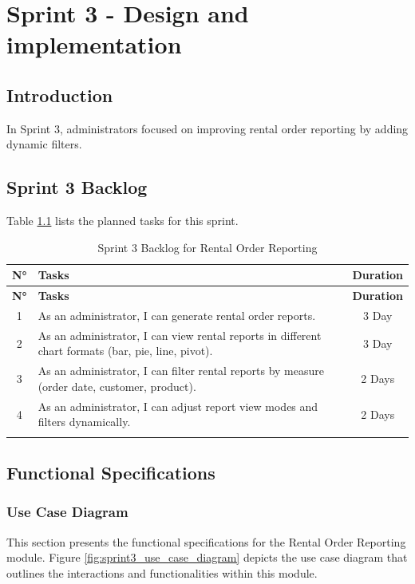 \chapter{Sprint 3 - Design and implementation}

\section*{Introduction}
In Sprint 3, administrators focused on improving rental order reporting by adding dynamic filters. 
\section{Sprint 3 Backlog}
Table \ref{tab:sprint3_backlog} lists the planned tasks for this sprint.

\begin{longtable}{|c|p{8cm}|c|}
    \hline
    \rowcolor{purple!20} \textbf{N°} & \textbf{Tasks} & \textbf{Duration} \\ \hline
    \endfirsthead
    \hline
    \rowcolor{purple!20} \textbf{N°} & \textbf{Tasks} & \textbf{Duration} \\ \hline
    \endhead
    1 & As an administrator, I can generate rental order reports. & 3 Day \\ \hline
    2 & As an administrator, I can view rental reports in different chart formats (bar, pie, line, pivot). & 3 Day \\ \hline
    3 & As an administrator, I can filter rental reports by measure (order date, customer, product). & 2 Days \\ \hline
    4 & As an administrator, I can adjust report view modes and filters dynamically. & 2 Days \\ \hline
    \caption{Sprint 3 Backlog for Rental Order Reporting}
    \label{tab:sprint3_backlog}
\end{longtable}

\section{Functional Specifications}

\subsection{Use Case Diagram}
This section presents the functional specifications for the Rental Order Reporting module. Figure \ref{fig:sprint3_use_case_diagram} depicts the use case diagram that outlines the interactions and functionalities within this module.

